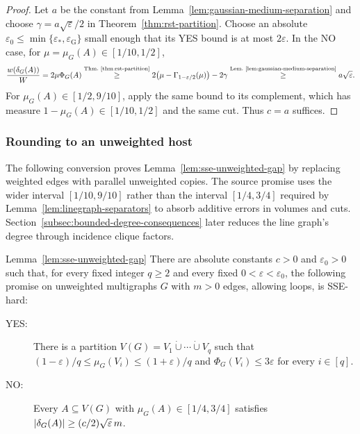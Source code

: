 \begin{proof}
Let $a$ be the constant from Lemma~\ref{lem:gaussian-medium-separation}
and choose $\gamma=a\sqrt\varepsilon/2$ in
Theorem~\ref{thm:rst-partition}.
Choose an absolute $\varepsilon_0\leq\min\{\varepsilon_*,\varepsilon_{\mathrm G}\}$
small enough that its YES bound is at most $2\varepsilon$.
In the NO case, for $\mu=\mu_G(A)\in[1/10,1/2]$,
\[
 \frac{w(\delta_G(A))}{W}
 =2\mu\Phi_G(A)
 \overset{\text{Thm.~\ref{thm:rst-partition}}}{\geq}
 2\bigl(\mu-\Gamma_{1-\varepsilon/2}(\mu)\bigr)-2\gamma
 \overset{\text{Lem.~\ref{lem:gaussian-medium-separation}}}{\geq}
 a\sqrt\varepsilon.
\]
For $\mu_G(A)\in[1/2,9/10]$, apply the same bound to its
complement, which has measure $1-\mu_G(A)\in[1/10,1/2]$ and the
same cut. Thus $c=a$ suffices.
\end{proof}

\subsubsection{Rounding to an unweighted host}

The following conversion proves Lemma~\ref{lem:sse-unweighted-gap}
by replacing weighted edges with parallel unweighted copies.
The source promise uses the wider interval
$[1/10,9/10]$ rather than the interval $[1/4,3/4]$ required by
Lemma~\ref{lem:linegraph-separators} to absorb additive errors in
volumes and cuts. Section~\ref{subsec:bounded-degree-consequences}
later reduces the line graph's degree through incidence clique factors.

\begin{restatedlemma}{Lemma~\ref{lem:sse-unweighted-gap}}
There are absolute constants $c>0$ and $\varepsilon_0>0$ such that,
for every fixed integer $q\geq2$ and every fixed
$0<\varepsilon<\varepsilon_0$, the following promise on unweighted
multigraphs $G$ with $m>0$ edges, allowing loops, is SSE-hard:
\begin{description}
\item[YES:] There is a partition
  $V(G)=V_1\mathbin{\dot\cup}\cdots\mathbin{\dot\cup}V_q$ such that
  $(1-\varepsilon)/q\leq\mu_G(V_i)\leq(1+\varepsilon)/q$ and
  $\Phi_G(V_i)\leq3\varepsilon$ for every $i\in[q]$.
\item[NO:] Every $A\subseteq V(G)$ with
  $\mu_G(A)\in[1/4,3/4]$ satisfies
  $|\delta_G(A)|\geq(c/2)\sqrt{\varepsilon}\,m$.
\end{description}
\end{restatedlemma}

